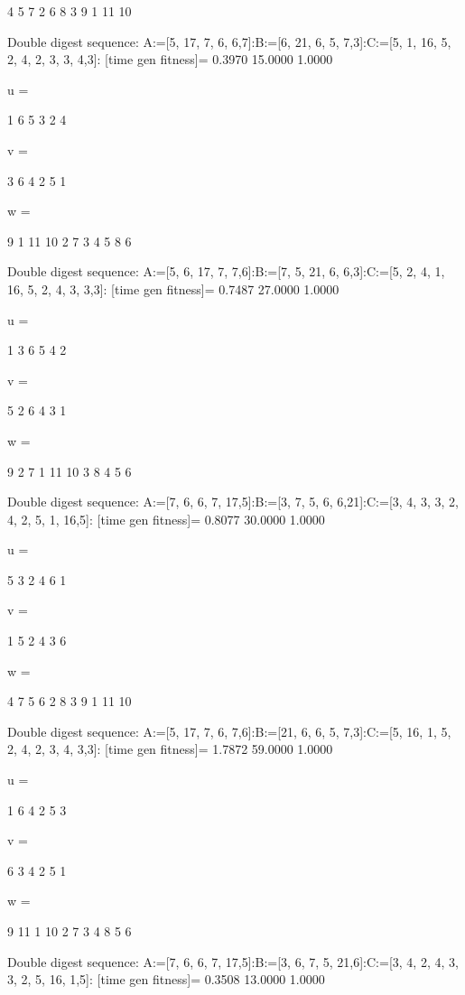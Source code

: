      4     5     7     2     6     8     3     9     1    11    10

Double digest sequence:
A:=[5, 17, 7, 6, 6,7]:B:=[6, 21, 6, 5, 7,3]:C:=[5, 1, 16, 5, 2, 4, 2, 3, 3, 4,3]:
[time gen fitness]=
    0.3970   15.0000    1.0000


u =

     1     6     5     3     2     4


v =

     3     6     4     2     5     1


w =

     9     1    11    10     2     7     3     4     5     8     6

Double digest sequence:
A:=[5, 6, 17, 7, 7,6]:B:=[7, 5, 21, 6, 6,3]:C:=[5, 2, 4, 1, 16, 5, 2, 4, 3, 3,3]:
[time gen fitness]=
    0.7487   27.0000    1.0000


u =

     1     3     6     5     4     2


v =

     5     2     6     4     3     1


w =

     9     2     7     1    11    10     3     8     4     5     6

Double digest sequence:
A:=[7, 6, 6, 7, 17,5]:B:=[3, 7, 5, 6, 6,21]:C:=[3, 4, 3, 3, 2, 4, 2, 5, 1, 16,5]:
[time gen fitness]=
    0.8077   30.0000    1.0000


u =

     5     3     2     4     6     1


v =

     1     5     2     4     3     6


w =

     4     7     5     6     2     8     3     9     1    11    10

Double digest sequence:
A:=[5, 17, 7, 6, 7,6]:B:=[21, 6, 6, 5, 7,3]:C:=[5, 16, 1, 5, 2, 4, 2, 3, 4, 3,3]:
[time gen fitness]=
    1.7872   59.0000    1.0000


u =

     1     6     4     2     5     3


v =

     6     3     4     2     5     1


w =

     9    11     1    10     2     7     3     4     8     5     6

Double digest sequence:
A:=[7, 6, 6, 7, 17,5]:B:=[3, 6, 7, 5, 21,6]:C:=[3, 4, 2, 4, 3, 3, 2, 5, 16, 1,5]:
[time gen fitness]=
    0.3508   13.0000    1.0000


